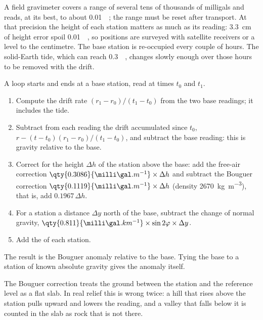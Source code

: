 A field gravimeter covers a range of several tens of thousands of
milligals and reads, at its best, to about \qty{0.01}{\milli\gal}; the
range must be reset after transport. At that precision the height of
each station matters as much as its reading: \qty{3.3}{cm} of height
error spoil \qty{0.01}{\milli\gal}, so positions are surveyed with
satellite receivers or a level to the centimetre. The base station is
re-occupied every couple of hours. The solid-Earth tide, which can reach
\qty{0.3}{\milli\gal}, changes slowly enough over those hours to be
removed with the drift.

\begin{method}\label{met:b3:field-lab-methods-3:loop}
A loop starts and ends at a base station, read at times $t_0$ and $t_1$.
\begin{enumerate}
  \item Compute the drift rate $(r_1 - r_0)/(t_1 - t_0)$ from the two
        base readings; it includes the tide.
  \item Subtract from each reading the drift accumulated since $t_0$,
        $r - (t - t_0)(r_1 - r_0)/(t_1 - t_0)$, and subtract the base
        reading: this is gravity relative to the base.
  \item Correct for the height $\Delta h$ of the station above the base:
        add the free-air correction $\qty{0.3086}{\milli\gal.m^{-1}}
        \times\Delta h$ and subtract the Bouguer correction
        $\qty{0.1119}{\milli\gal.m^{-1}}\times\Delta h$ (density
        \qty{2670}{kg.m^{-3}}), that is, add $0.1967\,\Delta h$.
  \item For a station a distance $\Delta y$ north of the base, subtract
        the change of normal gravity, $\qty{0.811}{\milli\gal.km^{-1}}
        \times\sin 2\varphi\times\Delta y$.
  \item Add the  of each station.
\end{enumerate}
The result is the Bouguer anomaly relative to the base. Tying the base
to a station of known absolute gravity gives the anomaly itself.
\end{method}

The Bouguer correction treats the ground between the station and the
reference level as a flat slab. In real relief this is wrong twice:
a hill that rises above the station pulls upward and lowers the
reading, and a valley that falls below it is counted in the slab as
rock that is not there.

